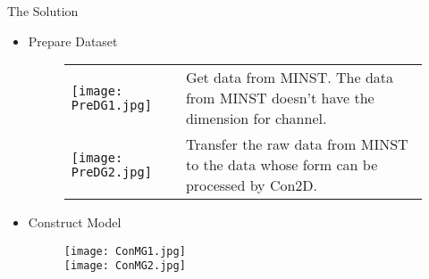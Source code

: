 \documentclass{beamer}
\begin{document}
\begin{frame}{The Solution}
\begin{itemize}
\item Prepare Dataset
\begin{figure}
  \begin{flushleft}
  \begin{tabular}{p{} p{}}
  \vspace{-10pt}\texttt{[image: PreDG1.jpg]}&\vspace{-20pt} \small{Get data from MINST. The data from MINST doesn't have the dimension for channel.}\\
  \vspace{0pt}\texttt{[image: PreDG2.jpg]}&\vspace{0pt}\small{Transfer the raw data from MINST to the data whose form can be processed by Con2D.}
  \end{tabular}
  \end{flushleft}
\end{figure}
\end{itemize}
\end{frame}


\begin{frame}
\begin{itemize}
\item Construct Model
\begin{figure}
  \texttt{[image: ConMG1.jpg]}\\
  \texttt{[image: ConMG2.jpg]}
\end{figure}
\end{itemize}
\end{frame}
\end{document}
